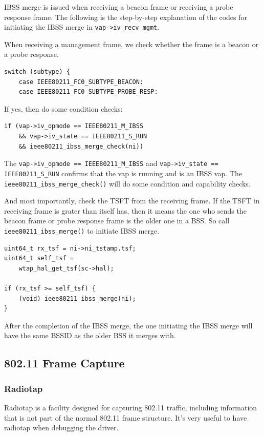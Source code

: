 \documentclass[conference]{IEEEtran}
\begin{document}
IBSS merge is issued when receiving a beacon frame or receiving a probe response frame. The following is the step-by-step explanation of the codes for initiating the IBSS merge in \lstinline{vap->iv_recv_mgmt}.

When receiving a management frame, we check whether the frame is a beacon or a probe response. 
\begin{lstlisting}
switch (subtype) {
    case IEEE80211_FC0_SUBTYPE_BEACON:
    case IEEE80211_FC0_SUBTYPE_PROBE_RESP:
\end{lstlisting}

If yes, then do some condition checks:

\begin{lstlisting}
if (vap->iv_opmode == IEEE80211_M_IBSS 
    && vap->iv_state == IEEE80211_S_RUN 
    && ieee80211_ibss_merge_check(ni))
\end{lstlisting}

The \lstinline{vap->iv_opmode == IEEE80211_M_IBSS} and \lstinline{vap->iv_state == IEEE80211_S_RUN} confirms that the vap is running and is an IBSS vap. The \lstinline{ieee80211_ibss_merge_check()} will do some condition and capability checks. 

And most importantly, check the TSFT from the receiving frame. If the TSFT in receiving frame is grater than itself has, then it means the one who sends the beacon frame or probe response frame is the older one in a BSS. So call \lstinline{ieee80211_ibss_merge()} to initiate IBSS merge.

\begin{lstlisting}
uint64_t rx_tsf = ni->ni_tstamp.tsf;
uint64_t self_tsf = 
    wtap_hal_get_tsf(sc->hal);

if (rx_tsf >= self_tsf) {
    (void) ieee80211_ibss_merge(ni);
}
\end{lstlisting}

After the completion of the IBSS merge, the one initiating the IBSS merge will have the same BSSID as the older BSS it merges with.

\subsection{802.11 Frame Capture}
\subsubsection{Radiotap}
Radiotap is a facility designed for capturing 802.11 traffic, including information that is not part of the normal 802.11 frame structure. It’s very useful to have radiotap when debugging the driver.
\end{document}
